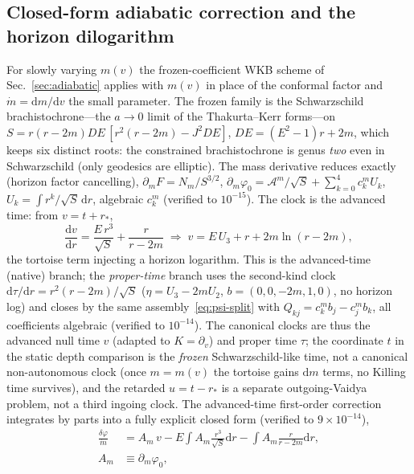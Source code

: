 \documentclass[
    aps, prd, twocolumn, superscriptaddress,
    showpacs, nofootinbib, floatfix
]{revtex4-2}
\newcommand{\dd}{\mathrm{d}}
\begin{document}
\subsection{Closed-form adiabatic correction and the horizon dilogarithm}
\label{sec:vaidya-adiabatic}
For slowly varying $m(v)$ the frozen-coefficient WKB scheme of
Sec.~\ref{sec:adiabatic} applies with $m(v)$ in place of the conformal factor and
$\dot m=\dd m/\dd v$ the small parameter. The frozen family is the Schwarzschild
brachistochrone---the $a\to0$ limit of the Thakurta--Kerr forms---on
$S=r(r-2m)DE\,[r^2(r-2m)-J^2 DE]$, $DE=(E^2-1)r+2m$, which keeps six distinct roots:
the constrained brachistochrone is genus \emph{two} even in Schwarzschild (only
geodesics are elliptic). The mass derivative reduces exactly (horizon factor
cancelling), $\partial_m F=N_m/S^{3/2}$,
$\partial_m\varphi_0=\mathcal{A}^m/\sqrt S+\sum_{k=0}^4 c_k^m U_k$, $U_k=\int
r^k/\sqrt S\,\dd r$, algebraic $c_k^m$ (verified to $10^{-15}$). The clock is the
advanced time: from $v=t+r_*$,
\begin{equation}
    \frac{\dd v}{\dd r}=\frac{E\,r^3}{\sqrt S}+\frac{r}{r-2m}
    \;\Rightarrow\; v=E\,U_3+r+2m\ln(r-2m),
    \label{eq:vaidya-clock}
\end{equation}
the tortoise term injecting a horizon logarithm. This is the advanced-time (native)
branch; the \emph{proper-time} branch uses the second-kind clock
$\dd\tau/\dd r=r^2(r-2m)/\sqrt S$ ($\eta=U_3-2m U_2$, $b=(0,0,-2m,1,0)$, no horizon
log) and closes by the same assembly~\eqref{eq:psi-split} with $Q_{kj}=c_k^m b_j-c_j^m
b_k$, all coefficients algebraic (verified to $10^{-14}$). The canonical clocks are thus
the advanced null time $v$ (adapted to $K=\partial_v$) and proper time $\tau$; the
coordinate $t$ in the static depth comparison is the \emph{frozen} Schwarzschild-like
time, not a canonical non-autonomous clock (once $m=m(v)$ the tortoise gains $\dd m$
terms, no Killing time survives), and the retarded $u=t-r_*$ is a separate
outgoing-Vaidya problem, not a third ingoing clock. The advanced-time
first-order correction integrates by parts into a fully explicit closed form (verified
to $9\times10^{-14}$),
\begin{equation}
\begin{split}
    \frac{\delta\varphi}{\dot m}&=A_m\,v-E\!\int\! A_m\frac{r^3}{\sqrt S}\dd r
    -\int\! A_m\frac{r}{r-2m}\dd r,\\
    A_m&\equiv\partial_m\varphi_0,
\end{split}
    \label{eq:vaidya-deltaphi}
\end{equation}
\end{document}
